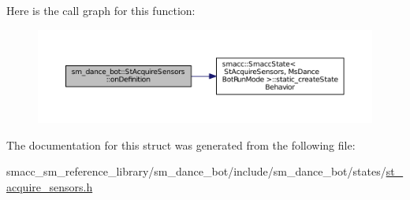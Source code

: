 Here is the call graph for this function\+:
\nopagebreak
\begin{figure}[H]
\begin{center}
\leavevmode
\includegraphics[width=350pt]{structsm__dance__bot_1_1StAcquireSensors_ae30f4b633faa922070fc8412b6dd78fc_cgraph}
\end{center}
\end{figure}




The documentation for this struct was generated from the following file\+:\begin{DoxyCompactItemize}
\item 
smacc\+\_\+sm\+\_\+reference\+\_\+library/sm\+\_\+dance\+\_\+bot/include/sm\+\_\+dance\+\_\+bot/states/\hyperlink{st__acquire__sensors_8h}{st\+\_\+acquire\+\_\+sensors.\+h}\end{DoxyCompactItemize}
